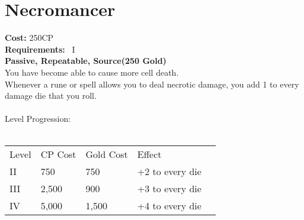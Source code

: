\section{Necromancer}\label{perk:necromancer}
\textbf{Cost:} 250CP\\
\textbf{Requirements:}~ I\\
\textbf{Passive, Repeatable, Source(250 Gold)}\\
You have become able to cause more cell death.\\
Whenever a rune or spell allows you to deal necrotic damage, you add 1 to every damage die that you roll.\\
\\
Level Progression:\\
\\
\begin{tabular}{l | l | l | l | l}
    Level & CP Cost & Gold Cost &  Effect\\
    II & 750 & 750 & +2 to every die\\
    III & 2,500 & 900 & +3 to every die\\
    IV & 5,000 & 1,500 & +4 to every die\\
\end{tabular}